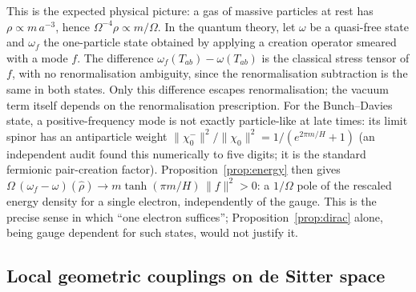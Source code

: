 \documentclass[11pt,a4paper]{article}
\theoremstyle{definition}
\begin{document}
This is the expected physical picture: a gas of massive particles at rest has $\rho\propto m\,a^{-3}$, hence $\Omega^{-4}\rho\propto m/\Omega$. In the quantum theory, let $\omega$ be a quasi-free state and $\omega_{f}$ the one-particle state obtained by applying a creation operator smeared with a mode $f$. The difference $\omega_{f}(T_{ab})-\omega(T_{ab})$ is the classical stress tensor of $f$, with no renormalisation ambiguity, since the renormalisation subtraction is the same in both states. Only this difference escapes renormalisation; the vacuum term itself depends on the renormalisation prescription. For the Bunch--Davies state, a positive-frequency mode is not exactly particle-like at late times: its limit spinor has an antiparticle weight $\|\chi_{0}^{-}\|^{2}/\|\chi_{0}\|^{2}=1/(e^{2\pi m/H}+1)$ (an independent audit found this numerically to five digits; it is the standard fermionic pair-creation factor). Proposition~\ref{prop:energy} then gives $\Omega\,(\omega_{f}-\omega)(\hat\rho)\to m\tanh(\pi m/H)\,\|f\|^{2}>0$: a $1/\Omega$ pole of the rescaled energy density for a single electron, independently of the gauge. This is the precise sense in which ``one electron suffices''; Proposition~\ref{prop:dirac} alone, being gauge dependent for such states, would not justify it.

\subsection{Local geometric couplings on de Sitter space}
\label{sec:coupling}
\end{document}
